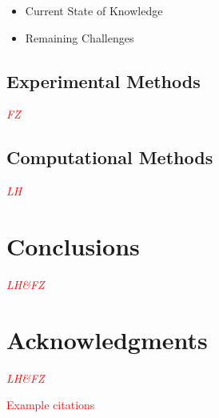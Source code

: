 \documentclass[journal]{new-aiaa}
\begin{document}
\begin{itemize}
    \item Current State of Knowledge
    \item Remaining Challenges
\end{itemize}


\subsection{Experimental Methods} \label{subsec:currentstateexperimental}

\textcolor{red}{\emph{FZ}}


\subsection{Computational Methods} \label{subsec:currentstatecomputational}



\textcolor{red}{\emph{LH}}














\section{Conclusions}

\textcolor{red}{\emph{LH\&FZ}}



\section*{Acknowledgments} %

\textcolor{red}{\emph{LH\&FZ}}


\textcolor{red}{Example citations}

\cite{nakamura1993bluffbody}


\end{document}
